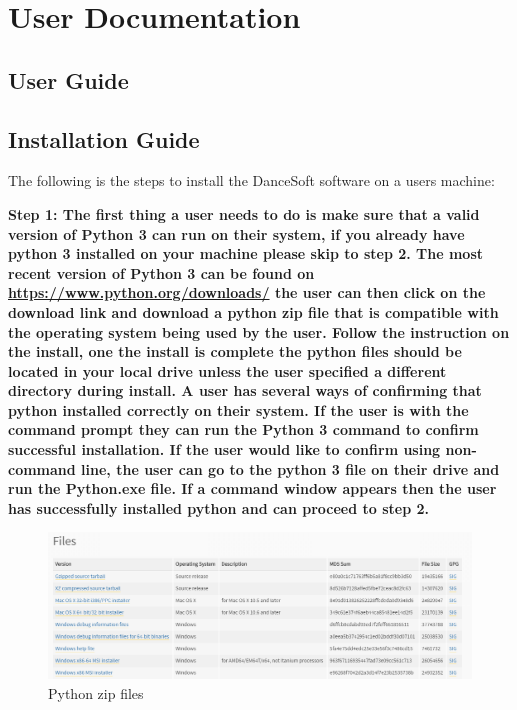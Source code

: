 

\chapter{User Documentation}

\section{User Guide}


\section{Installation Guide}
The following is the steps to install the DanceSoft software on a users machine:

\bf Step 1: \rm
	The first thing a user needs to do is make sure that a valid version of Python 3 can run on their system, if you already have python 3 installed on your machine please skip to step 2.
	The most recent version of Python 3 can be found on \url{https://www.python.org/downloads/} the user can then click on the download link and download a python zip file that is compatible with the operating system being used by the user.
	Follow the instruction on the install, one the install is complete the python files should be located in your local drive unless the user specified a different directory during install. A user has several ways of confirming that python installed correctly on their system. If the user is  with the command prompt they can run the Python 3 command to confirm successful installation. If the user would like to confirm using non-command line, the user can go to the python 3 file on their drive and run the Python.exe file. If a command window appears then the user has successfully installed python and can proceed to step 2.
	
\begin{figure}
  \includegraphics[width=\linewidth]{pics/pythonFiles.png}
  \caption{Python zip files}
  \label{fig:User doc: python files}
\end{figure}

